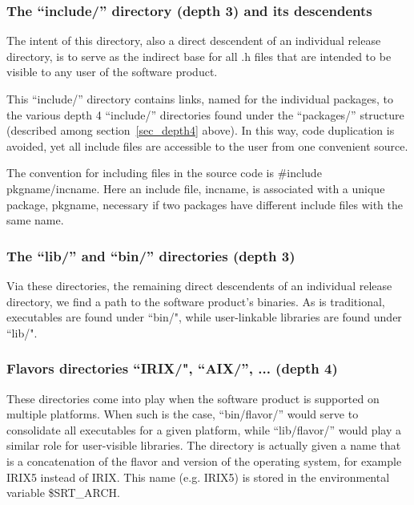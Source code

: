 \subsubsection{The ``include/'' directory (depth 3) and its descendents}
\label{sec_include}

    The intent of this directory, also a direct descendent of an individual 
release directory, is to serve as the indirect base for all .h files that 
are intended to be visible to any user of the software product. 

    This ``include/'' directory contains links, named for the individual 
packages, to the various depth 4 ``include/'' directories found under the 
``packages/'' structure (described among section~\ref{sec_depth4} above). In 
this way, code duplication is avoided, yet all include files are accessible to 
the user from one convenient source. 

The convention for including files in the source code is
 \#include pkgname/incname.
Here an 
include file, incname, is associated with a unique package, pkgname, necessary 
if two packages have different include files with the same name.      

\subsubsection{The ``lib/'' and ``bin/'' directories (depth 3)}

    Via these directories, the remaining direct descendents of an individual 
release directory, we find a path to the software product's binaries. As is 
traditional, executables are found under ``bin/", while user-linkable libraries 
are found under ``lib/". 

\subsubsection{Flavors directories ``IRIX/", ``AIX/'', ... (depth 4)}
\label{app_flavors}

\begin{sloppypar}
    These directories come into play when the software product is supported on
multiple platforms. When such is the case, ``bin/flavor/'' would serve to 
consolidate all executables for a given platform, while ``lib/flavor/'' would 
play a similar role for user-visible libraries. 
The directory is actually given a name that is a concatenation of the flavor
and version of the operating system, for example IRIX5 instead of IRIX.
This name (e.g. IRIX5) is stored in the environmental variable \$SRT\_ARCH.
\end{sloppypar}

